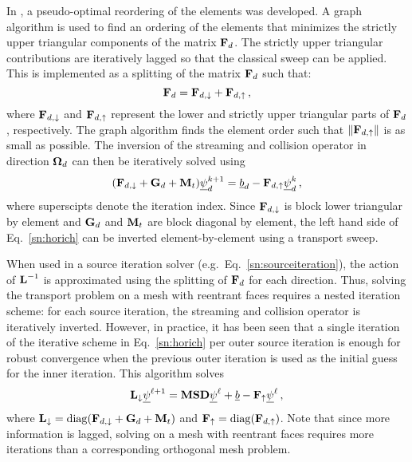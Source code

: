 \documentclass[../doc.tex]{subfiles}
\begin{document}
In \textcite{graph_sweeps}, a pseudo-optimal reordering of the elements was developed. A graph algorithm is used to find an ordering of the elements that minimizes the strictly upper triangular components of the matrix $\boldsymbol{\mathrm{F}}_d$. The strictly upper triangular contributions are iteratively lagged so that the classical sweep can be applied. This is implemented as a splitting of the matrix $\boldsymbol{\mathrm{F}}_d$ such that: 
	\begin{equation}
		\boldsymbol{\mathrm{F}}_d = \boldsymbol{\mathrm{F}}_{d,\downarrow} + \boldsymbol{\mathrm{F}}_{d,\uparrow} \,,
	\end{equation}
where $\boldsymbol{\mathrm{F}}_{d,\downarrow}$ and $\boldsymbol{\mathrm{F}}_{d,\uparrow}$ represent the lower and strictly upper triangular parts of $\boldsymbol{\mathrm{F}}_d$, respectively. The graph algorithm finds the element order such that $\|\boldsymbol{\mathrm{F}}_{d,\uparrow}\|$ is as small as possible. The inversion of the streaming and collision operator in direction $\boldsymbol{\Omega}_d$ can then be iteratively solved using 
	\begin{equation} \label{sn:horich}
		(\boldsymbol{\mathrm{F}}_{d,\downarrow} + \boldsymbol{\mathrm{G}}_d + \boldsymbol{\mathrm{M}}_t)\underline{\psi}_d^{k+1} = \underline{b}_d - \boldsymbol{\mathrm{F}}_{d,\uparrow}\underline{\psi}_d^{k} \,,
	\end{equation}
where superscipts denote the iteration index. Since $\boldsymbol{\mathrm{F}}_{d,\downarrow}$ is block lower triangular by element and $\boldsymbol{\mathrm{G}}_d$ and $\boldsymbol{\mathrm{M}}_t$ are block diagonal by element, the left hand side of Eq.~\ref{sn:horich} can be inverted element-by-element using a transport sweep. 

When used in a source iteration solver (e.g.~Eq.~\ref{sn:sourceiteration}), the action of $\boldsymbol{\mathrm{L}}^{-1}$ is approximated using the splitting of $\boldsymbol{\mathrm{F}}_d$ for each direction. Thus, solving the transport problem on a mesh with reentrant faces requires a nested iteration scheme: for each source iteration, the streaming and collision operator is iteratively inverted. However, in practice, it has been seen that a single iteration of the iterative scheme in Eq.~\ref{sn:horich} per outer source iteration is enough for robust convergence when the previous outer iteration is used as the initial guess for the inner iteration. This algorithm solves 
	\begin{equation}
		\boldsymbol{\mathrm{L}}_{\downarrow} \underline{\psi}^{\ell+1} = \boldsymbol{\mathrm{M}}\boldsymbol{\mathrm{S}}\boldsymbol{\mathrm{D}}\underline{\psi}^\ell + \underline{b} - \boldsymbol{\mathrm{F}}_{\uparrow} \underline{\psi}^\ell \,, 
	\end{equation}
where $\boldsymbol{\mathrm{L}}_{\downarrow} = \operatorname{diag}(\boldsymbol{\mathrm{F}}_{d,\downarrow} + \boldsymbol{\mathrm{G}}_d + \boldsymbol{\mathrm{M}}_t)$ and $\boldsymbol{\mathrm{F}}_{\uparrow} = \operatorname{diag}(\boldsymbol{\mathrm{F}}_{d,\uparrow})$. 
Note that since more information is lagged, solving on a mesh with reentrant faces requires more iterations than a corresponding orthogonal mesh problem. 
\end{document}

